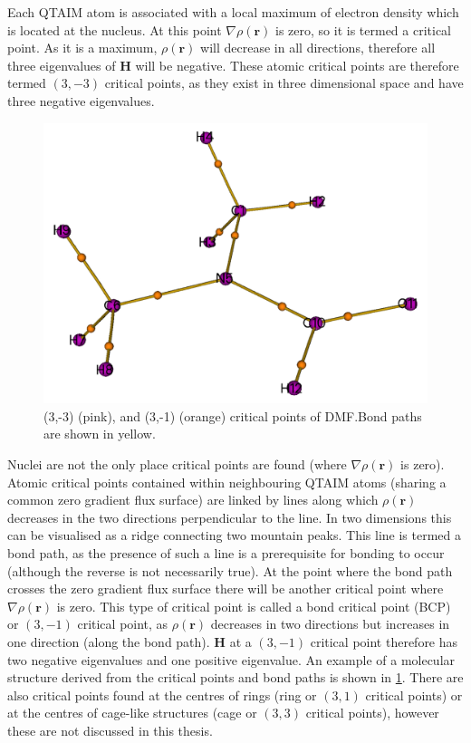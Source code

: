 \begin{refsection}
Each QTAIM atom is associated with a local maximum of electron density which is located at the nucleus.
At this point $ \nabla\rho(\textbf{r}) $ is zero, so it is termed a critical point.
As it is a maximum, $ \rho(\textbf{r}) $ will decrease in all directions, therefore all three eigenvalues of $ \mathbf{H} $ will be negative.
These atomic critical points are therefore termed $ (3,-3) $ critical points, as they exist in three dimensional space and have three negative eigenvalues.

\begin{figure}
    \includegraphics[width=0.45\linewidth]{Figures/dmf-cp.pdf}
    \caption[Critical points of DMF.]{(3,-3) (pink), and (3,-1) (orange) critical points of DMF.\@ Bond paths are shown in yellow.}\label{fig:dmf-cps}
\end{figure}

Nuclei are not the only place critical points are found (where $ \nabla\rho(\textbf{r}) $ is zero).
Atomic critical points contained within neighbouring QTAIM atoms (sharing a common zero gradient flux surface) are linked by lines along which $ \rho(\textbf{r}) $ decreases in the two directions perpendicular to the line.
In two dimensions this can be visualised as a ridge connecting two mountain peaks.
This line is termed a bond path, as the presence of such a line is a prerequisite for bonding to occur (although the reverse is not necessarily true).
At the point where the bond path crosses the zero gradient flux surface there will be another critical point where $ \nabla\rho(\textbf{r}) $ is zero.
This type of critical point is called a bond critical point (BCP) or $ (3,-1) $ critical point, as $ \rho(\textbf{r}) $ decreases in two directions but increases in one direction (along the bond path).
$ \mathbf{H} $ at a $ (3,-1) $ critical point therefore has two negative eigenvalues and one positive eigenvalue.
An example of a molecular structure derived from the critical points and bond paths is shown in \cref{fig:dmf-cps}.
There are also critical points found at the centres of rings (ring or $ (3,1) $ critical points) or at the centres of cage-like structures (cage or $ (3,3) $ critical points), however these are not discussed in this thesis.


\end{refsection}

